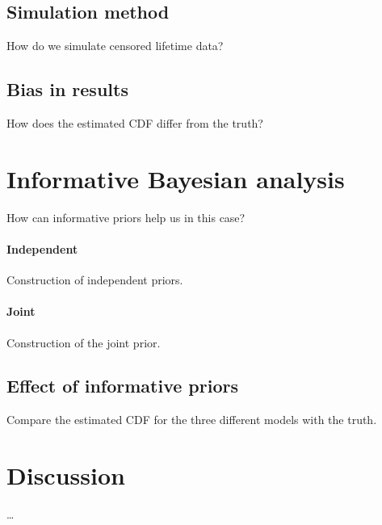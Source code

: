 \subsection{Simulation method}

How do we simulate censored lifetime data?

\subsection{Bias in results}

How does the estimated CDF differ from the truth?

\section{Informative Bayesian analysis}

How can informative priors help us in this case?

\paragraph*{Independent}

Construction of independent priors.

\paragraph*{Joint}

Construction of the joint prior.

\subsection{Effect of informative priors}

Compare the estimated CDF for the three different models with the truth.

\section{Discussion}

\ldots